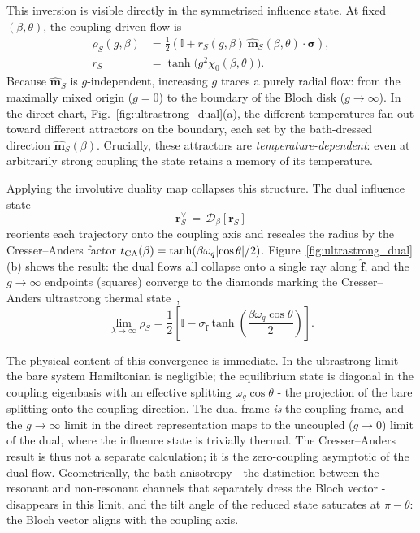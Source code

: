 This inversion is visible directly in the symmetrised influence state.
At fixed $(\beta,\theta)$, the coupling-driven flow is
\begin{equation}
\begin{aligned}
\rho_S(g,\beta)
&=\frac{1}{2}\!\left(\mathbb I+r_S(g,\beta)\,
\hat{\mathbf m}_S(\beta,\theta)\!\cdot\!\boldsymbol{\sigma}\right),\\
r_S
&=\tanh\!\big(g^2\chi_0(\beta,\theta)\big).
\end{aligned}
\label{eq:rhoS_flow_v3}
\end{equation}
Because $\hat{\mathbf m}_S$ is $g$-independent, increasing $g$ traces a purely
radial flow: from the maximally mixed origin ($g=0$) to the boundary of the
Bloch disk ($g\to\infty$). In the direct chart,
Fig.~\ref{fig:ultrastrong_dual}(a), the different temperatures fan out toward
different attractors on the boundary, each set by the bath-dressed direction
$\hat{\mathbf m}_S(\beta)$. Crucially, these attractors are
\emph{temperature-dependent}: even at arbitrarily strong coupling the state
retains a memory of its temperature.

Applying the involutive duality map collapses this structure. The dual
influence state
\begin{equation}
\mathbf r_S^\vee
\,=\,\mathcal D_\beta[\mathbf r_S]
\label{eq:ca_dual_map}
\end{equation}
reorients each trajectory onto the coupling axis and rescales the radius by
the Cresser--Anders factor
$t_{\rm CA}(\beta)=\tanh(\beta\omega_q|\!\cos\theta|/2)$.
Figure~\ref{fig:ultrastrong_dual}(b) shows the result: the dual flows all
collapse onto a single ray along $\hat{\mathbf f}$, and the
$g\to\infty$ endpoints (squares) converge to the diamonds marking the
Cresser--Anders ultrastrong thermal
state~\cite{cresserWeakUltrastrongCoupling2021a},
\begin{equation}
\lim_{\lambda\to\infty}\rho_S
=\frac{1}{2}\left[\mathbb I-\sigma_{\hat{\mathbf f}}
\tanh\!\left(\frac{\beta\omega_q\cos\theta}{2}\right)\right].
\label{eq:ca_limit_qubit}
\end{equation}

The physical content of this convergence is immediate. In the ultrastrong
limit the bare system Hamiltonian is negligible; the equilibrium state is
diagonal in the coupling eigenbasis with an effective splitting
$\omega_q\cos\theta$ - the projection of the bare splitting onto the
coupling direction. The dual frame \emph{is} the coupling frame, and the
$g\to\infty$ limit in the direct representation maps to the uncoupled
($g\to 0$) limit of the dual, where the influence state is trivially thermal.
The Cresser--Anders result is thus not a separate calculation; it is the
zero-coupling asymptotic of the dual flow. Geometrically, the bath anisotropy
- the distinction between the resonant and non-resonant channels that
separately dress the Bloch vector - disappears in this limit, and the tilt
angle of the reduced state saturates at $\pi-\theta$: the Bloch vector aligns
with the coupling axis.

